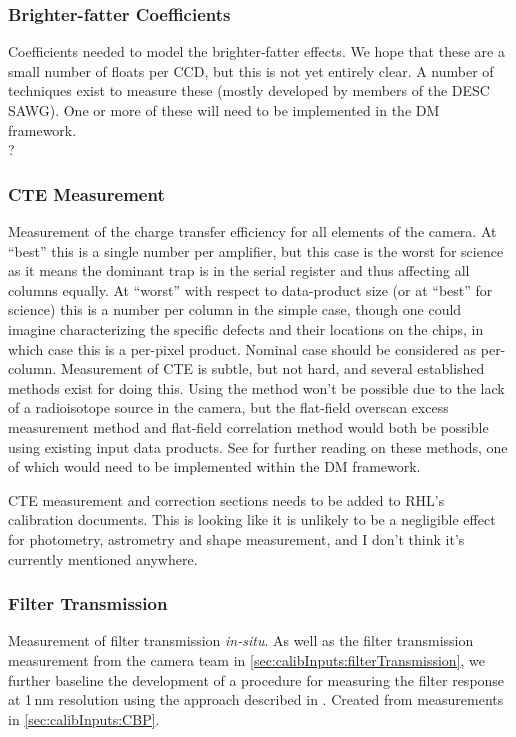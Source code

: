 \subsubsection{Brighter-fatter Coefficients}\label{calibProducts:brighterFatterCoeffs}
Coefficients needed to model the brighter-fatter effects. We hope that these are a small number of floats per CCD, but this is not yet entirely clear.
\alg A number of techniques exist to measure these (mostly developed by members of the DESC SAWG). One or more of these will need to be implemented in the DM framework.
\\ \dragons ?


\subsubsection{CTE Measurement}\label{calibProducts:CTE}
Measurement of the charge transfer efficiency for all elements of the camera. At ``best'' this is a single number per amplifier, but this case is the worst for science as it means the dominant trap is in the serial register and thus affecting all columns equally. At ``worst'' with respect to data-product size (or at ``best'' for science) this is a number per column in the simple case, though one could imagine characterizing the specific defects and their locations on the chips, in which case this is a per-pixel product. Nominal case should be considered as per-column.
\alg Measurement of CTE is subtle, but not hard, and several established methods exist for doing this. Using the \fefiftyfive method won't be possible due to the lack of a radioisotope source in the camera, but the flat-field overscan excess measurement method and flat-field correlation method would both be possible using existing input data products. See \xxx for further reading on these methods, one of which would need to be implemented within the DM framework.

\begin{note}
	CTE measurement and correction sections needs to be added to RHL's calibration documents. This is looking like it is unlikely to be a negligible effect for photometry, astrometry and shape measurement, and I don't think it's currently mentioned anywhere.
\end{note}


\subsubsection{Filter Transmission}\label{calibProducts:filterTransmission}
Measurement of filter transmission \emph{in-situ}. As well as the filter transmission measurement from the camera team in \secsymbol\ref{sec:calibInputs:filterTransmission}, we further baseline the development of a procedure for measuring the filter response at 1\,nm resolution using the approach described in \cite{Lupton15}.
\alg Created from measurements in \secsymbol\ref{sec:calibInputs:CBP}. 


